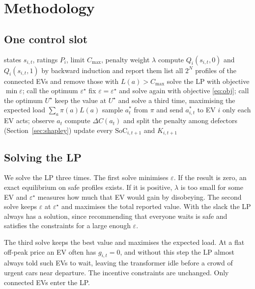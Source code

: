 \documentclass{article}
\newcommand{\soc}{\mathrm{SoC}}
\newcommand{\cmax}{C_{\max}}
\begin{document}
\section{Methodology}

\subsection{One control slot}

\begin{algorithm}[h]
\caption{One slot of the rolling procedure}
\label{alg:slot}
\begin{algorithmic}[1]
\Require states $s_{i,t}$, ratings $P_i$, limit $\cmax$, penalty weight $\lambda$
  \State compute $Q_i(s_{i,t},0)$ and $Q_i(s_{i,t},1)$ by backward induction and report them
\EndFor
\State list all $2^N$ profiles of the connected EVs and remove those with $L(a) > \cmax$
\State solve the LP with objective $\min \varepsilon$; call the optimum $\varepsilon^\star$
\State fix $\varepsilon = \varepsilon^\star$ and solve again with objective \eqref{eq:obj}; call the optimum $U^\star$
\State keep the value at $U^\star$ and solve a third time, maximising the expected load $\sum_a \pi(a) L(a)$
\State sample $a^*_t$ from $\pi$ and send $a^*_{i,t}$ to EV $i$ only
\State each EV acts; observe $a_t$
\State compute $\Delta C(a_t)$ and split the penalty among defectors (Section~\ref{sec:shapley})
\State update every $\soc_{i,t+1}$ and $K_{i,t+1}$
\end{algorithmic}
\end{algorithm}

\subsection{Solving the LP}

We solve the LP three times. The first solve minimises $\varepsilon$. If the result is zero, an exact equilibrium on safe profiles exists. If it is positive, $\lambda$ is too small for some EV and $\varepsilon^\star$ measures how much that EV would gain by disobeying. The second solve keeps $\varepsilon$ at $\varepsilon^\star$ and maximises the total reported value. With the slack the LP always has a solution, since recommending that everyone waits is safe and satisfies the constraints for a large enough $\varepsilon$.

The third solve keeps the best value and maximises the expected load. At a flat off-peak price an EV often has $g_{i,t} = 0$, and without this step the LP almost always told such EVs to wait, leaving the transformer idle before a crowd of urgent cars near departure. The incentive constraints are unchanged. Only connected EVs enter the LP.
\end{document}
